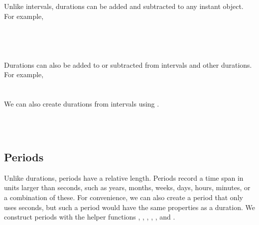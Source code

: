 \documentclass[article]{jss}
\begin{document}
\\
\\

\\
\\
\\

Unlike intervals, durations can be added and subtracted to any instant object. For example,\\

\\
\\

\\
\\

Durations can also be added to or subtracted from intervals and other durations. For example,\\

\\
\\

We can also create durations from intervals using . 

\\
\\


\subsection{Periods}
\label{sec:periods}

Unlike durations, periods have a relative length. Periods record a time span in units larger than seconds, such as years, months, weeks, days, hours, minutes, or a combination of these. For convenience, we can also create a period that only uses seconds, but such a period would have the same properties as a duration. We construct periods with the helper functions , , , , , and  .\\

\\
\\
\end{document}
